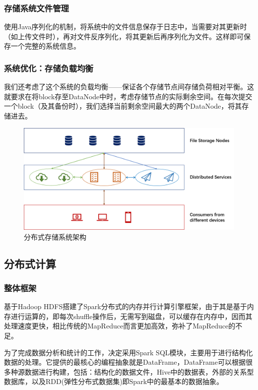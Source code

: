 \documentclass[12pt,a4paper]{article}
\begin{document}
\subsubsection{存储系统文件管理}
使用Java序列化的机制，将系统中的文件信息保存于日志中，当需要对其更新时（如上传文件时），再对文件反序列化，将其更新后再序列化为文件。这样即可保存一个完整的系统信息。
\subsubsection{系统优化：存储负载均衡}
我们还考虑了这个系统的负载均衡——保证各个存储节点间存储负荷相对平衡。这就要求在将block存至DataNode中时，考虑存储节点的实际剩余空间。在每次提交一个block（及其备份时），我们选择当前剩余空间最大的两个DataNode，将其存储进去。


\begin{figure}[htb]
\centering
\includegraphics[width=14cm]{storage_architecture}
\caption{分布式存储系统架构 \label{storage_architecture}}
\end{figure}

\subsection{分布式计算}
\subsubsection{整体框架}
基于Hadoop HDFS搭建了Spark分布式的内存并行计算引擎框架，由于其是基于内存进行运算的，即每次shuffle操作后，无需写到磁盘，可以缓存在内存中，因而其处理速度更快，相比传统的MapReduce而言更加高效，弥补了MapReduce的不足。

为了完成数据分析和统计的工作，决定采用Spark SQL模块，主要用于进行结构化数据的处理。它提供的最核心的编程抽象就是DataFrame，DataFrame可以根据很多种源数据进行构建，包括：结构化的数据文件，Hive中的数据表，外部的关系型数据库，以及RDD(弹性分布式数据集)即Spark中的最基本的数据抽象。
\end{document}
